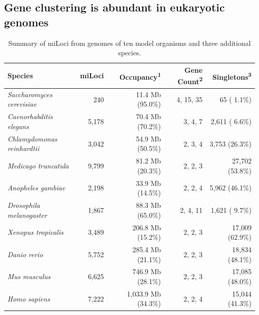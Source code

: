 \subsection{Gene clustering is abundant in eukaryotic genomes}

\begin{table}
\small
\caption{Summary of miLoci from genomes of ten model organisms and three additional species.}
\label{Table:miLocusSummaryModOrg}
\begin{tabularx}{\textwidth}{lrrrr}
\hline
\scriptsize
                            Species &               miLoci & Occupancy\textsuperscript{1} & Gene Count\textsuperscript{2} & Singletons\textsuperscript{3}  \\ \hline
\textit{Saccharomyces cerevisiae}   &                  240 &             11.4 Mb (95.0\%) &                     4, 15, 35 &                   65 ( 1.1\%)  \\
\textit{Caenorhabditis elegans}     &                5,178 &             70.4 Mb (70.2\%) &                       3, 4, 7 &                2,611 ( 6.6\%)  \\
\textit{Chlamydomonas reinhardtii}  &                3,042 &             54.9 Mb (50.5\%) &                       2, 3, 4 &                3,753 (26.3\%)  \\
\textit{Medicago truncatula}        &                9,799 &             81.2 Mb (20.3\%) &                       2, 2, 3 &               27,702 (53.8\%)  \\
\textit{Anopheles gambiae}          &                2,198 &             33.9 Mb (14.5\%) &                       2, 2, 4 &                5,962 (46.1\%)  \\
\textit{Drosophila melanogaster}    &                1,867 &             88.3 Mb (65.0\%) &                      2, 4, 11 &                1,621 ( 9.7\%)  \\
\textit{Xenopus tropicalis}         &                3,489 &            206.8 Mb (15.2\%) &                       2, 2, 3 &               17,009 (62.9\%)  \\
\textit{Danio rerio}                &                5,752 &            285.4 Mb (21.1\%) &                       2, 2, 3 &               18,834 (48.1\%)  \\
\textit{Mus musculus}               &                6,625 &            746.9 Mb (28.1\%) &                       2, 2, 3 &               17,085 (48.0\%)  \\
\textit{Homo sapiens}               &                7,222 &          1,033.9 Mb (34.3\%) &                       2, 2, 4 &               15,044 (41.3\%)  \\ \hline

\end{tabularx}
\end{table}
